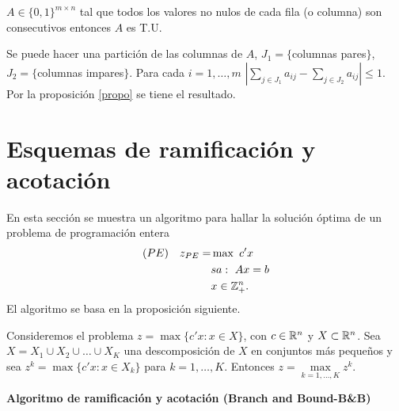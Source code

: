 \documentclass[PM.tex]{subfiles}
\begin{document}
\begin{prop}
$A\in\{0,1\}^{m\times n}$ tal que todos los valores no nulos de cada fila (o columna) son consecutivos entonces $A$ es T.U. 
\end{prop}
\begin{dem}
Se puede hacer una partición de las columnas de $A$, $J_1=\{$columnas pares$\}$, $J_2=\{$columnas impares$\}$. Para cada $i=1,\dots,m$ $|\sum_{j\in J_1}a_{ij}-\sum_{j\in J_2}a_{ij}|\leq 1$. Por la proposición \ref{propo} se tiene el resultado. 
\end{dem}

\section{Esquemas de ramificación y acotación}

En esta sección se muestra un algoritmo para hallar la solución óptima de un problema de programación entera
\begin{align*}
(PE)\quad z_{PE} = & \max\ c'x\\
               & sa:\ Ax=b\\
     		&x\in\mathbb{Z}_+^n.
\end{align*}
El algoritmo se basa en la proposición siguiente. 
\begin{prop}
Consideremos el problema $z=\max\{c'x:x\in X\}$, con $c\in\mathbb{R}^n$ y $X\subset\mathbb{R}^n$. Sea $X=X_1\cup X_2\cup\dots\cup X_K$ una descomposición de $X$ en conjuntos más pequeños y sea $z^k=\max\{c'x:x\in X_k\}$ para $k=1,\dots,K$. Entonces $z=\underset{k=1,\dots,K}{\max} z^k$.
\end{prop}

\begin{center}
{\bf Algoritmo de ramificación y acotación (Branch and Bound-B\&B)}
\end{center}
\end{document}
